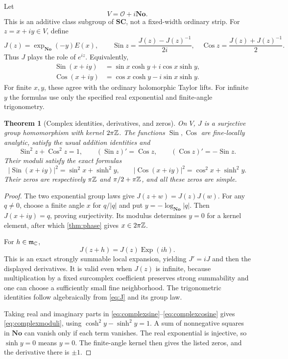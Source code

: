 \documentclass[11pt,letterpaper]{article}
\newtheorem{theorem}{Theorem}[section]
\theoremstyle{definition}
\theoremstyle{remark}
\newcommand{\No}{\mathbf{No}}
\newcommand{\SC}{\mathbf{SC}}
\newcommand{\OO}{\mathcal O}\newcommand{\mm}{\mathfrak m}
\newcommand{\Sin}{\operatorname{Sin}}\newcommand{\Cos}{\operatorname{Cos}}
\newcommand{\Exp}{\operatorname{Exp}}\newcommand{\Log}{\operatorname{Log}}
\numberwithin{equation}{section}
\begin{document}
Let
\[
 V=\OO+i\No.
\]
This is an additive class subgroup of $\SC$, not a fixed-width ordinary strip. For $z=x+iy\in V$, define
\begin{equation}\label{eq:J}
 J(z)=\exp_\No(-y)E(x),
 \qquad
 \Sin z=\frac{J(z)-J(z)^{-1}}{2i},\quad
 \Cos z=\frac{J(z)+J(z)^{-1}}2.
\end{equation}
Thus $J$ plays the role of $e^{iz}$. Equivalently,
\begin{align}
 \Sin(x+iy)&=\sin x\cosh y+i\cos x\sinh y,\label{eq:complexsine}\\
 \Cos(x+iy)&=\cos x\cosh y-i\sin x\sinh y.\label{eq:complexcosine}
\end{align}
For finite $x,y$, these agree with the ordinary holomorphic Taylor lifts. For infinite $y$ the formulas use only the specified real exponential and finite-angle trigonometry.

\begin{theorem}[Complex identities, derivatives, and zeros]\label{thm:complex}
On $V$, $J$ is a surjective group homomorphism with kernel $2\pi\mathbb Z$. The functions $\Sin,\Cos$ are fine-locally analytic, satisfy the usual addition identities and
\[
 \Sin^2z+\Cos^2z=1,\qquad
 (\Sin z)'=\Cos z,\qquad(\Cos z)'=-\Sin z.
\]
Their moduli satisfy the exact formulas
\begin{equation}\label{eq:complexmoduli}
 |\Sin(x+iy)|^2=\sin^2x+\sinh^2y,
 \qquad
 |\Cos(x+iy)|^2=\cos^2x+\sinh^2y.
\end{equation}
Their zeros are respectively $\pi\mathbb Z$ and $\pi/2+\pi\mathbb Z$, and all these zeros are simple.
\end{theorem}
\begin{proof}
The two exponential group laws give $J(z+w)=J(z)J(w)$. For any $q\ne0$, choose a finite angle $x$ for $q/|q|$ and put $y=-\log_\No|q|$. Then $J(x+iy)=q$, proving surjectivity. Its modulus determines $y=0$ for a kernel element, after which \cref{thm:phase} gives $x\in2\pi\mathbb Z$.

For $h\in\mm_\C$,
\[
 J(z+h)=J(z)\Exp(ih).
\]
This is an exact strongly summable local expansion, yielding $J'=iJ$ and then the displayed derivatives. It is valid even when $J(z)$ is infinite, because multiplication by a fixed surcomplex coefficient preserves strong summability and one can choose a sufficiently small fine neighborhood. The trigonometric identities follow algebraically from \eqref{eq:J} and its group law.

Taking real and imaginary parts in \eqref{eq:complexsine}--\eqref{eq:complexcosine} gives \eqref{eq:complexmoduli}, using $\cosh^2y-\sinh^2y=1$. A sum of nonnegative squares in $\No$ can vanish only if each term vanishes. The real exponential is injective, so $\sinh y=0$ means $y=0$. The finite-angle kernel then gives the listed zeros, and the derivative there is $\pm1$.
\end{proof}
\end{document}
